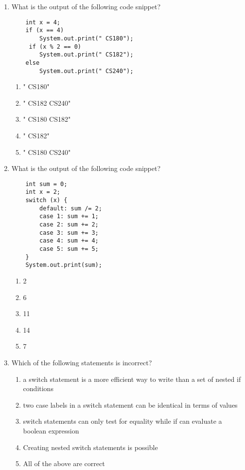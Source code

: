 \documentclass[S17-Final.tex]{subfiles}
\begin{document}
\begin{enumerate}
\item What is the output of the following code snippet?
\begin{lstlisting}
    int x = 4;
    if (x == 4)
        System.out.print(" CS180");
	 if (x % 2 == 0) 
        System.out.print(" CS182");
    else
        System.out.print(" CS240");	
\end{lstlisting}
	
\begin{enumerate}
\item  " CS180"
\item  " CS182 CS240"
\item  " CS180 CS182"
\item  " CS182"
\item  " CS180 CS240"
\end{enumerate}

\item What is the output of the following code snippet?
\begin{lstlisting}
    int sum = 0;
    int x = 2;
    switch (x) {
        default: sum /= 2;
        case 1: sum += 1;
        case 2: sum += 2;
        case 3: sum += 3;
        case 4: sum += 4;
        case 5: sum += 5;
	}
	System.out.print(sum);
\end{lstlisting}
	
\begin{enumerate}
\item  2
\item  6
\item  11
\item  14
\item  7
\end{enumerate}

\item Which of the following statements is incorrect?
	
\begin{enumerate}
\item  a switch statement is a more efficient way to write than a set of nested if conditions
\item  two case labels in a switch statement can be identical in terms of values
\item  switch statements can only test for equality while if can evaluate a boolean expression
\item  Creating nested switch statements is possible
\item  All of the above are correct
\end{enumerate}


\end{enumerate}
\end{document}
